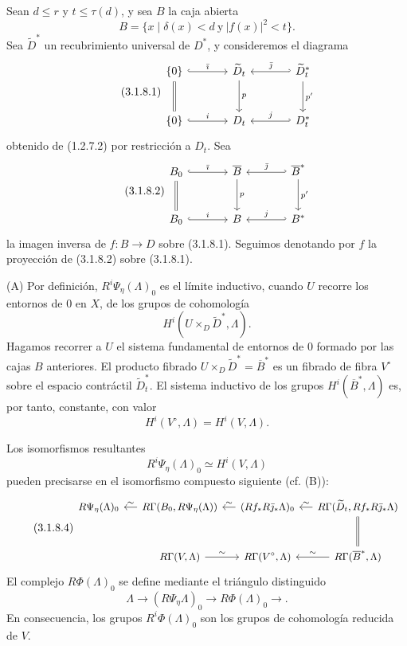 Sean $d\leq r$ y $t\leq\tau(d)$, y sea $B$ la caja abierta
\[
B=\{x\mid\delta(x)<d\ \text{y}\ |f(x)|^2<t\}.
\]
Sea $\widetilde D^*$ un recubrimiento universal de $D^*$, y consideremos
el diagrama
\begin{equation}\tag{3.1.8.1}
\begin{tikzcd}[column sep=large,row sep=large]
\{0\} \arrow[r,hook,"\bar\imath"] \arrow[d,equal]
  & \widetilde D_t \arrow[d,"p"]
  & \widetilde D_t^* \arrow[l,hook',"\bar\jmath"'] \arrow[d,"p'"] \\
\{0\} \arrow[r,hook,"i"]
  & D_t
  & D_t^* \arrow[l,hook',"j"']
\end{tikzcd}
\end{equation}
obtenido de (1.2.7.2) por restricción a $D_t$. Sea
\begin{equation}\tag{3.1.8.2}
\begin{tikzcd}[column sep=large,row sep=large]
B_0 \arrow[r,hook,"\bar\imath"] \arrow[d,equal]
  & \overline B \arrow[d,"p"]
  & \overline B^* \arrow[l,hook',"\bar\jmath"'] \arrow[d,"p'"] \\
B_0 \arrow[r,hook,"i"]
  & B
  & B^* \arrow[l,hook',"j"']
\end{tikzcd}
\end{equation}
la imagen inversa de $f:B\to D$ sobre (3.1.8.1). Seguimos denotando
por $f$ la proyección de (3.1.8.2) sobre (3.1.8.1).

\medskip
\noindent\textup{(A)}
Por definición, $R^i\Psi_\eta(\Lambda)_0$ es el límite inductivo,
cuando $U$ recorre los entornos de $0$ en $X$, de los grupos de
cohomología
\[
H^i(U\times_D\widetilde D^*,\Lambda).
\]
Hagamos recorrer a $U$ el sistema fundamental de entornos de $0$
formado por las cajas $B$ anteriores. El producto fibrado
$U\times_D\widetilde D^*=\overline B^*$ es un fibrado de fibra
$V^\circ$ sobre el espacio contráctil $\widetilde D_t^*$. El sistema
inductivo de los grupos $H^i(\overline B^*,\Lambda)$ es, por tanto,
constante, con valor
\[
H^i(V^\circ,\Lambda)=H^i(V,\Lambda).
\]

\pageoriginale

Los isomorfismos resultantes
\begin{equation}\tag{3.1.8.3}
R^i\Psi_\eta(\Lambda)_0\simeq H^i(V,\Lambda)
\end{equation}
pueden precisarse en el isomorfismo compuesto siguiente (cf. (B)):
\begin{equation}\tag{3.1.8.4}
\begin{tikzcd}[column sep=small,row sep=large,cells={nodes={font=\small}}]
R\Psi_\eta(\Lambda)_0
  & R\Gamma(B_0,R\Psi_\eta(\Lambda)) \arrow[l,"\sim"']
  & (Rf_*R\bar\jmath_*\Lambda)_0 \arrow[l,"\sim"']
  & R\Gamma(\widetilde D_t,Rf_*R\bar\jmath_*\Lambda)
      \arrow[l,"\sim"'] \arrow[d,equal] \\
{}
  & R\Gamma(V,\Lambda) \arrow[r,"\sim"]
  & R\Gamma(V^\circ,\Lambda)
  & R\Gamma(\overline B^*,\Lambda) \arrow[l,"\sim"']
\end{tikzcd}
\end{equation}
El complejo $R\Phi(\Lambda)_0$ se define mediante el triángulo distinguido
\[
\Lambda\longrightarrow(R\Psi_\eta\Lambda)_0
\longrightarrow R\Phi(\Lambda)_0\longrightarrow{}.
\]
En consecuencia, los grupos $R^i\Phi(\Lambda)_0$ son los grupos de
cohomología reducida de $V$.

